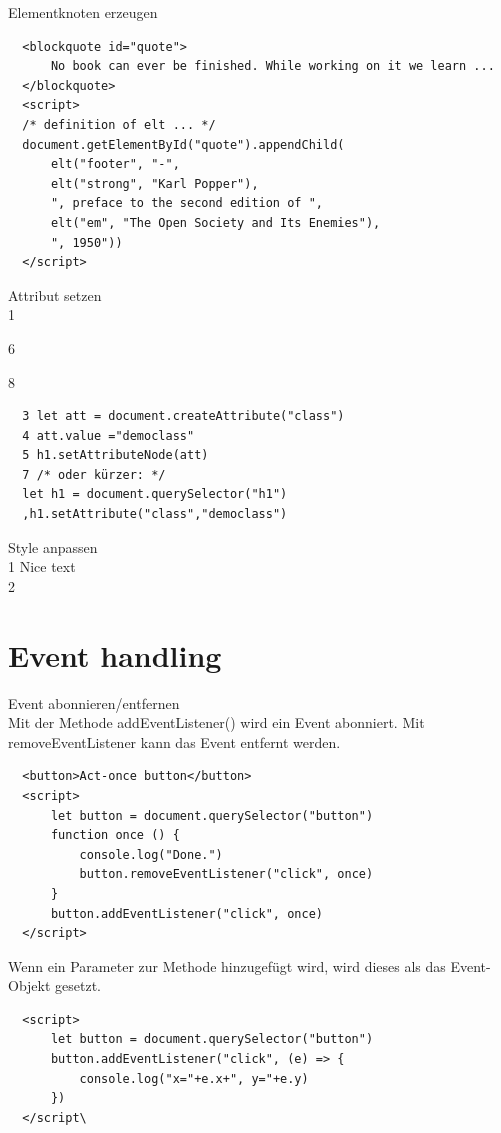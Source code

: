  Elementknoten erzeugen
  
  \begin{verbatim}
  <blockquote id="quote">
      No book can ever be finished. While working on it we learn ...
  </blockquote>
  <script>
  /* definition of elt ... */
  document.getElementById("quote").appendChild(
      elt("footer", "-",
      elt("strong", "Karl Popper"),
      ", preface to the second edition of ",
      elt("em", "The Open Society and Its Enemies"),
      ", 1950"))
  </script>
  \end{verbatim}
  
  Attribut setzen\\
  1
  
  6
  
  8
  
  \begin{verbatim}
  3 let att = document.createAttribute("class")
  4 att.value ="democlass"
  5 h1.setAttributeNode(att)
  7 /* oder kürzer: */
  let h1 = document.querySelector("h1")
  ,h1.setAttribute("class","democlass")
  \end{verbatim}
  
  Style anpassen\\
  1 Nice text\\
  2 
  
  \section*{Event handling}
  Event abonnieren/entfernen\\
  Mit der Methode addEventListener() wird ein Event abonniert. Mit removeEventListener kann das Event entfernt werden.
  
  \begin{verbatim}
  <button>Act-once button</button>
  <script>
      let button = document.querySelector("button")
      function once () {
          console.log("Done.")
          button.removeEventListener("click", once)
      }
      button.addEventListener("click", once)
  </script>
  \end{verbatim}
  
  Wenn ein Parameter zur Methode hinzugefügt wird, wird dieses als das Event-Objekt gesetzt.
  
  \begin{verbatim}
  <script>
      let button = document.querySelector("button")
      button.addEventListener("click", (e) => {
          console.log("x="+e.x+", y="+e.y)
      })
  </script\
  \end{verbatim}
  
